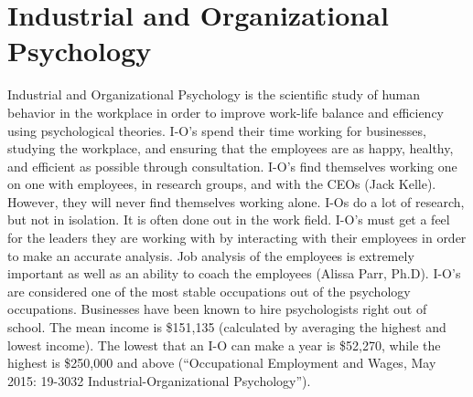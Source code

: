 \chapter{Industrial and Organizational Psychology}

Industrial and Organizational Psychology is the scientific study of human behavior in the workplace in order to improve work-life balance and efficiency using psychological theories. I-O’s spend their time working for businesses, studying the workplace, and ensuring that the employees are as happy, healthy, and efficient as possible through consultation. I-O’s find themselves working one on one with employees, in research groups, and with the CEOs (Jack Kelle). However, they will never find themselves working alone. I-Os do a lot of research, but not in isolation. It is often done out in the work field. I-O’s must get a feel for the leaders they are working with by interacting with their employees in order to make an accurate analysis. Job analysis of the employees is extremely important as well as an ability to coach the employees (Alissa Parr, Ph.D). I-O’s are considered one of the most stable occupations out of the psychology occupations. Businesses have been known to hire psychologists right out of school. The mean income is \$151,135 (calculated by averaging the highest and lowest income). The lowest that an I-O can make a year is \$52,270, while the highest is \$250,000 and above (“Occupational Employment and Wages, May 2015: 19-3032 Industrial-Organizational Psychology”). 

